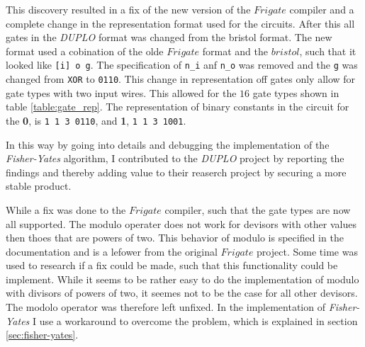 \documentclass[twoside,11pt,openright]{report}
\newcommand{\FY}{\textit{Fisher-Yates} }
\newcommand{\DUPLO}{\textit{DUPLO} }
\begin{document}
\bigskip

\begin{table}[t]
\centering
{}
\caption{A table of the 16 different gate types, that can be used in a circuit of the type used in \DUPLO}
\label{table:gate_rep}
\end{table}


This discovery resulted in a fix of the new version of the $Frigate$ compiler and a complete change in the representation format used for the circuits. After this all gates in the \DUPLO format was changed from the bristol format. The new format used a cobination of the olde $Frigate$ format and the $bristol$, such that it looked like \verb|[i] o g|. The specification of \verb|n_i| anf \verb|n_o| was removed and the \verb|g| was changed from \verb|XOR| to \verb|0110|. This change in representation off gates only allow for gate types with two input wires. This allowed for the $16$ gate types shown in table \ref{table:gate_rep}. The representation of binary constants in the circuit for the \textbf{0}, is \verb|1 1 3 0110|, and \textbf{1}, \verb|1 1 3 1001|.

In this way by going into details and debugging the implementation of the \FY algorithm, I contributed to the \DUPLO project by reporting the findings and thereby adding value to their reaserch project by securing a more stable product.

While a fix was done to the $Frigate$ compiler, such that the gate types are now all supported. The modulo operater does not work for devisors with other values then thoes that are powers of two. This behavior of modulo is specified in the documentation and is a lefower from the original $Frigate$ project. Some time was used to research if a fix could be made, such that this functionality could be implement. While it seems to be rather easy to do the implementation of modulo with divisors of powers of two, it seemes not to be the case for all other devisors. The modolo operator was therefore left unfixed. In the implementation of \FY I use a workaround to overcome the problem, which is explained in section \ref{sec:fisher-yates}.
\end{document}
